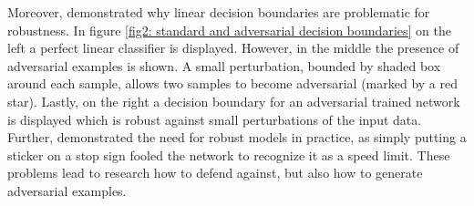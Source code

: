 \documentclass{article}
\begin{document}
Moreover, \cite{b2} demonstrated why linear decision boundaries are problematic for robustness. In figure \ref{fig2: standard and adversarial decision boundaries} on the left a perfect linear classifier is displayed. However, in the middle the presence of adversarial examples is shown. A small perturbation, bounded by shaded box around each sample, allows two samples to become adversarial (marked by a red star). Lastly, on the right a decision boundary for an adversarial trained network is displayed which is robust against small perturbations of the input data. Further, \cite{b6} demonstrated the need for robust models in practice, as simply putting a sticker on a stop sign fooled the network to recognize it as a speed limit. These problems lead to research how to defend against, but also how to generate adversarial examples. \\
  
\end{document}
